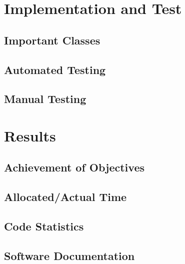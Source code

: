 \documentclass[a4paper,parskip=full]{scrreprt}
\begin{document}
\chapter{Implementation and Test}

\section{Important Classes}

\section{Automated Testing}

\section{Manual Testing}


\chapter{Results}

\section{Achievement of Objectives}


\section{Allocated/Actual Time}
\section{Code Statistics}

\section{Software Documentation}


\end{document}
